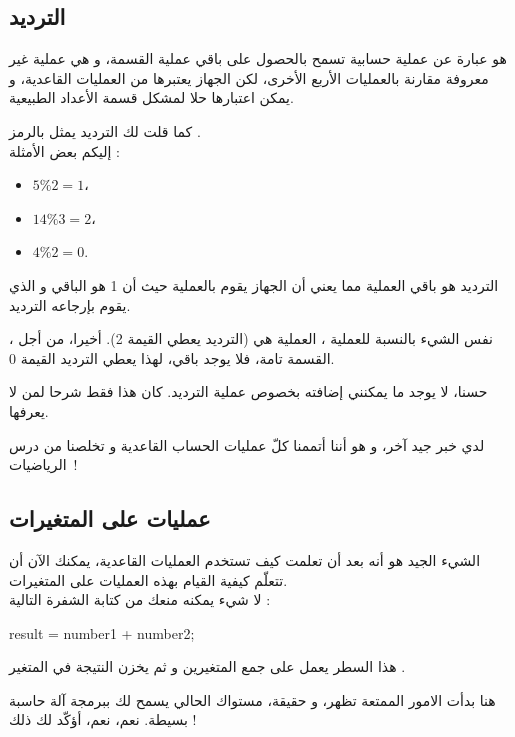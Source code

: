 \subsection{الترديد}

هو عبارة عن عملية حسابية تسمح بالحصول على باقي عملية القسمة، و هي عملية غير معروفة مقارنة بالعمليات الأربع الأخرى، لكن الجهاز يعتبرها من العمليات القاعدية، و يمكن اعتبارها حلا لمشكل قسمة الأعداد الطبيعية.

كما قلت لك الترديد يمثل بالرمز
\InlineCode{\%}.\\
إليكم بعض الأمثلة :

\begin{itemize}
  \item $ 5 \% 2 = 1 $،
  \item $ 14 \% 3 = 2 $،
  \item $ 4 \% 2 = 0 $.
\end{itemize}

الترديد
هو باقي العملية
مما يعني أن الجهاز يقوم بالعملية
حيث أن 1 هو الباقي و الذي يقوم بإرجاعه الترديد.

نفس الشيء بالنسبة للعملية
،
العملية هي
(الترديد يعطي القيمة  2). أخيرا، من أجل
،
القسمة تامة، فلا يوجد باقي، لهذا يعطي الترديد القيمة 0.

حسنا، لا يوجد ما يمكنني إضافته بخصوص عملية الترديد. كان هذا فقط شرحا لمن لا يعرفها.

لدي خبر جيد آخر، و هو أننا أتممنا كلّ عمليات الحساب القاعدية و تخلصنا من درس الرياضيات~!

\subsection{عمليات على المتغيرات}

الشيء الجيد هو أنه بعد أن تعلمت كيف تستخدم العمليات القاعدية، يمكنك الآن أن تتعلّم كيفية القيام بهذه العمليات على المتغيرات.\\
لا شيء يمكنه منعك من كتابة الشفرة التالية :

\begin{Csource}
  result = number1 + number2;
\end{Csource}

هذا السطر يعمل على جمع المتغيرين
و
ثم يخزن النتيجة في المتغير
.

هنا بدأت الامور الممتعة تظهر، و حقيقة، مستواك الحالي يسمح لك ببرمجة آلة حاسبة بسيطة. نعم، نعم، أؤكّد لك ذلك !

